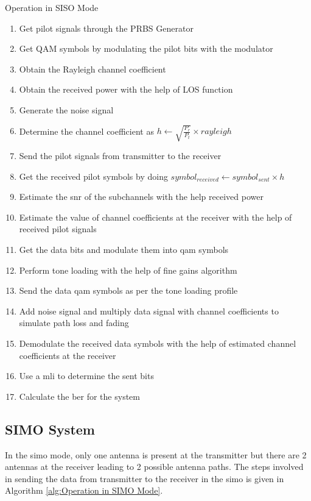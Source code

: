 \begin{algorithm}[!htbp]
\caption{Operation in SISO Mode}
\label{alg:Operation in SISO Mode}
\begin{enumerate}
\item Get pilot signals through the PRBS Generator
\item Get QAM symbols by modulating the pilot bits with the modulator
\item Obtain the Rayleigh channel coefficient
\item Obtain the received power with the help of LOS function
\item Generate the noise signal
\item Determine the channel coefficient as $h \gets \sqrt{\frac{P_r}{P_t}} \times rayleigh$
\item Send the pilot signals from transmitter to the receiver
\item Get the received pilot symbols by doing $symbol_{received} \gets symbol_{sent} \times h$
\item Estimate the \acrshort{snr} of the subchannels with the help received power
\item Estimate the value of channel coefficients at the receiver with the help of received pilot signals
\item Get the data bits and modulate them into \acrshort{qam} symbols
\item Perform tone loading with the help of fine gains algorithm
\item Send the data \acrshort{qam} symbols as per the tone loading profile
\item Add noise signal and multiply data signal with channel coefficients to simulate path loss and fading
\item Demodulate the received data symbols with the help of estimated channel coefficients at the receiver
\item Use a \acrlong{mli} to determine the sent bits
\item Calculate the \acrshort{ber} for the system
\end{enumerate}
\end{algorithm} 


\subsection{SIMO System}
In the \acrlong{simo} mode, only one antenna is present at the transmitter but there are 2 antennas at the receiver leading to 2 possible antenna paths. The steps involved in sending the data from transmitter to the receiver in the \acrshort{simo} is given in Algorithm \ref{alg:Operation in SIMO Mode}.

